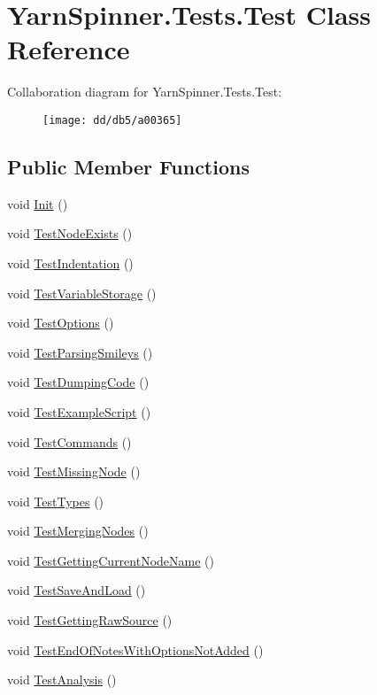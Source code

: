 \hypertarget{a00077}{\section{Yarn\-Spinner.\-Tests.\-Test Class Reference}
\label{a00077}
}


Collaboration diagram for Yarn\-Spinner.\-Tests.\-Test\-:
\nopagebreak
\begin{figure}[H]
\begin{center}
\leavevmode
\texttt{[image: dd/db5/a00365]}
\end{center}
\end{figure}
\subsection*{Public Member Functions}
\begin{DoxyCompactItemize}
\item 
void \hyperlink{a00077_a1a64841e6815e57869c1132427a44349}{Init} ()
\item 
void \hyperlink{a00077_a2beee99e50888b2813bb4cb1b5d7db1f}{Test\-Node\-Exists} ()
\item 
void \hyperlink{a00077_a7367e28f0328bc09e1129c2c86026d34}{Test\-Indentation} ()
\item 
void \hyperlink{a00077_aa27a8cd7c1926ae4d92956a5f6a24d9e}{Test\-Variable\-Storage} ()
\item 
void \hyperlink{a00077_aecbebd20a89e19887c38cc45deb33551}{Test\-Options} ()
\item 
void \hyperlink{a00077_a9d1192dcf67863cfc835368d1c14916f}{Test\-Parsing\-Smileys} ()
\item 
void \hyperlink{a00077_a7ff97d839b8ce04eb6493afd4698c829}{Test\-Dumping\-Code} ()
\item 
void \hyperlink{a00077_afe989298d1984b105f2f187a42d54134}{Test\-Example\-Script} ()
\item 
void \hyperlink{a00077_a95f63c81611bdee5f210c61201546658}{Test\-Commands} ()
\item 
void \hyperlink{a00077_addf4c602c21c9c541adee828f8b7c0f8}{Test\-Missing\-Node} ()
\item 
void \hyperlink{a00077_a2d3abf96f13b1a8f111952e5294ada67}{Test\-Types} ()
\item 
void \hyperlink{a00077_a65c83f97636c7d2c0ba63d1ed0fa7881}{Test\-Merging\-Nodes} ()
\item 
void \hyperlink{a00077_a8eaf016cf430c42648190a2fdd9e9ad2}{Test\-Getting\-Current\-Node\-Name} ()
\item 
void \hyperlink{a00077_aaa4a2d0a30511d5d12459e3bb470b615}{Test\-Save\-And\-Load} ()
\item 
void \hyperlink{a00077_a6ba6563aea2806d7ec783f0bb4d26932}{Test\-Getting\-Raw\-Source} ()
\item 
void \hyperlink{a00077_a3f4243133a4195c80f39469f2d9875d2}{Test\-End\-Of\-Notes\-With\-Options\-Not\-Added} ()
\item 
void \hyperlink{a00077_a7034c82755c2b23d547102aa41770df1}{Test\-Analysis} ()
\end{DoxyCompactItemize}
